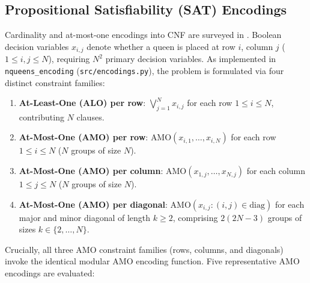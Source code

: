 \documentclass[a4paper,fleqn]{cas-sc}
\begin{document}
\subsection{Propositional Satisfiability (SAT) Encodings}
Cardinality and at-most-one encodings into CNF are surveyed in \citep{biere2021handbook}. Boolean decision variables $x_{i,j}$ denote whether a queen is placed at row $i$, column $j$ ($1 \le i, j \le N$), requiring $N^2$ primary decision variables. As implemented in \texttt{nqueens\_encoding} (\texttt{src/encodings.py}), the problem is formulated via four distinct constraint families:
\begin{enumerate}
    \item \textbf{At-Least-One (ALO) per row}: $\bigvee_{j=1}^N x_{i,j}$ for each row $1 \le i \le N$, contributing $N$ clauses.
    \item \textbf{At-Most-One (AMO) per row}: $\text{AMO}(x_{i,1}, \dots, x_{i,N})$ for each row $1 \le i \le N$ ($N$ groups of size $N$).
    \item \textbf{At-Most-One (AMO) per column}: $\text{AMO}(x_{1,j}, \dots, x_{N,j})$ for each column $1 \le j \le N$ ($N$ groups of size $N$).
    \item \textbf{At-Most-One (AMO) per diagonal}: $\text{AMO}(x_{i,j} : (i,j) \in \text{diag})$ for each major and minor diagonal of length $k \ge 2$, comprising $2(2N - 3)$ groups of sizes $k \in \{2, \dots, N\}$.
\end{enumerate}
Crucially, all three AMO constraint families (rows, columns, and diagonals) invoke the identical modular AMO encoding function. Five representative AMO encodings are evaluated:
\end{document}
